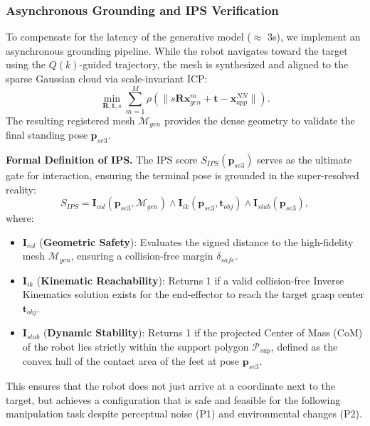 \documentclass[conference]{IEEEtran}
\begin{document}
\subsubsection{Asynchronous Grounding and IPS Verification}

To compensate for the latency of the generative model ($\approx$ 3s), we implement an asynchronous grounding pipeline. While the robot navigates toward the target using the $Q(k)$-guided trajectory, the mesh is synthesized and aligned to the sparse Gaussian cloud via scale-invariant ICP:
\begin{equation}
    \min_{\mathbf{R}, \mathbf{t}, s} \sum_{m=1}^M \rho \left( \|s \mathbf{R} \mathbf{x}_{gen}^m + \mathbf{t} - \mathbf{x}_{app}^{NN}\| \right) .
\end{equation}
The resulting registered mesh $\mathcal{M}_{gen}$ provides the dense geometry to validate the final standing pose $\mathbf{p}_{se3}$. 

\vspace{1mm}
\noindent \textbf{Formal Definition of IPS.}
The IPS score $S_{IPS}(\mathbf{p}_{se3})$ serves as the ultimate gate for interaction, ensuring the terminal pose is grounded in the super-resolved reality:
\begin{equation}
    S_{IPS} = \mathbf{I}_{col}(\mathbf{p}_{se3}, \mathcal{M}_{gen}) \land \mathbf{I}_{ik}(\mathbf{p}_{se3}, \mathbf{t}_{obj}) \land \mathbf{I}_{stab}(\mathbf{p}_{se3}) ,
\end{equation}
where:
\begin{itemize}
    \item $\mathbf{I}_{col}$ (\textbf{Geometric Safety}): Evaluates the signed distance to the high-fidelity mesh $\mathcal{M}_{gen}$, ensuring a collision-free margin $\delta_{safe}$.
    \item $\mathbf{I}_{ik}$ (\textbf{Kinematic Reachability}): Returns 1 if a valid collision-free Inverse Kinematics solution exists for the end-effector to reach the target grasp center $\mathbf{t}_{obj}$.
    \item $\mathbf{I}_{stab}$ (\textbf{Dynamic Stability}): Returns 1 if the projected Center of Mass (CoM) of the robot lies strictly within the support polygon $\mathcal{P}_{sup}$, defined as the convex hull of the contact area of the feet at pose $\mathbf{p}_{se3}$.
\end{itemize}
This ensures that the robot does not just arrive at a coordinate next to the target, but achieves a configuration that is safe and feasible for the following manipulation task despite perceptual noise (P1) and environmental changes (P2).
\end{document}
